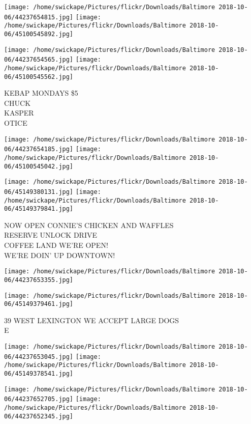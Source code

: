\documentclass[10pt,letterpaper]{article}
\begin{document}
\texttt{[image: /home/swickape/Pictures/flickr/Downloads/Baltimore 2018-10-06/44237654815.jpg]}
\texttt{[image: /home/swickape/Pictures/flickr/Downloads/Baltimore 2018-10-06/45100545892.jpg]}

\texttt{[image: /home/swickape/Pictures/flickr/Downloads/Baltimore 2018-10-06/44237654565.jpg]}
\texttt{[image: /home/swickape/Pictures/flickr/Downloads/Baltimore 2018-10-06/45100545562.jpg]}

KEBAP MONDAYS \$5\\
CHUCK\\
KASPER\\
OTICE\\
\pagebreak

\texttt{[image: /home/swickape/Pictures/flickr/Downloads/Baltimore 2018-10-06/44237654185.jpg]}
\texttt{[image: /home/swickape/Pictures/flickr/Downloads/Baltimore 2018-10-06/45100545042.jpg]}

\texttt{[image: /home/swickape/Pictures/flickr/Downloads/Baltimore 2018-10-06/45149380131.jpg]}
\texttt{[image: /home/swickape/Pictures/flickr/Downloads/Baltimore 2018-10-06/45149379841.jpg]}

NOW OPEN CONNIE'S CHICKEN AND WAFFLES\\
RESERVE UNLOCK DRIVE\\
COFFEE LAND WE'RE OPEN!\\
WE'RE DOIN' UP DOWNTOWN!\\
\pagebreak

\texttt{[image: /home/swickape/Pictures/flickr/Downloads/Baltimore 2018-10-06/44237653355.jpg]}

\vspace{0.25in}
\texttt{[image: /home/swickape/Pictures/flickr/Downloads/Baltimore 2018-10-06/45149379461.jpg]}

39 WEST LEXINGTON WE ACCEPT LARGE DOGS\\
E\\
\pagebreak

\texttt{[image: /home/swickape/Pictures/flickr/Downloads/Baltimore 2018-10-06/44237653045.jpg]}
\texttt{[image: /home/swickape/Pictures/flickr/Downloads/Baltimore 2018-10-06/45149378541.jpg]}

\texttt{[image: /home/swickape/Pictures/flickr/Downloads/Baltimore 2018-10-06/44237652705.jpg]}
\texttt{[image: /home/swickape/Pictures/flickr/Downloads/Baltimore 2018-10-06/44237652345.jpg]}
\end{document}
